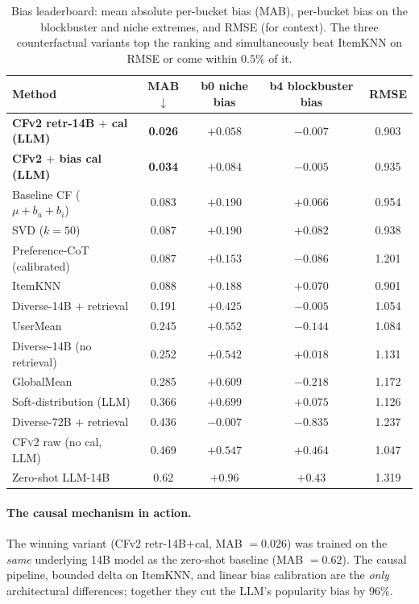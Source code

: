 \documentclass[11pt,a4paper]{article}
\newcommand{\best}[1]{\textcolor{goodgreen}{\textbf{#1}}}
\newcommand{\worst}[1]{\textcolor{badred}{#1}}
\begin{document}
\begin{table}[H]
\centering
\small
\caption{Bias leaderboard: mean absolute per-bucket bias (MAB), per-bucket
bias on the blockbuster and niche extremes, and RMSE (for context). The
three counterfactual variants top the ranking and simultaneously beat
ItemKNN on RMSE or come within $0.5\%$ of it.}
\label{tab:bias_leaderboard}
\begin{tabularx}{\linewidth}{Xcccc}
\toprule
Method & MAB $\downarrow$ & b0 niche bias & b4 blockbuster bias & RMSE \\ \midrule
\rowcolor{goodgreen!15}
\textbf{CFv2 retr-14B $+$ cal (LLM)} & \best{0.026} & $+0.058$ & $-0.007$ & 0.903 \\
\textbf{CFv2 $+$ bias cal (LLM)}      & \best{0.034} & $+0.084$ & $-0.005$ & 0.935 \\
Baseline CF ($\mu{+}b_u{+}b_i$)        & 0.083        & $+0.190$ & $+0.066$ & 0.954 \\
SVD ($k{=}50$)                         & 0.087        & $+0.190$ & $+0.082$ & 0.938 \\
Preference-CoT (calibrated)           & 0.087        & $+0.153$ & $-0.086$ & 1.201 \\
ItemKNN                                & 0.088        & $+0.188$ & $+0.070$ & 0.901 \\
Diverse-14B $+$ retrieval              & 0.191        & $+0.425$ & $-0.005$ & 1.054 \\
UserMean                               & 0.245        & $+0.552$ & $-0.144$ & 1.084 \\
Diverse-14B (no retrieval)             & 0.252        & $+0.542$ & $+0.018$ & 1.131 \\
GlobalMean                             & 0.285        & $+0.609$ & $-0.218$ & 1.172 \\
Soft-distribution (LLM)                & 0.366        & $+0.699$ & $+0.075$ & 1.126 \\
Diverse-72B $+$ retrieval              & 0.436        & $-0.007$ & $-0.835$ & 1.237 \\
\textsc{CFv2} raw (no cal, LLM)        & 0.469        & $+0.547$ & $+0.464$ & 1.047 \\
Zero-shot LLM-14B                      & \worst{0.62} & $+0.96$  & $+0.43$  & 1.319 \\
\bottomrule
\end{tabularx}
\end{table}

\paragraph{The causal mechanism in action.} The winning variant
(CFv2 retr-14B$+$cal, MAB $=0.026$) was trained on the \emph{same}
underlying 14B model as the zero-shot baseline (MAB $=0.62$). The
causal pipeline, bounded delta on ItemKNN, and linear bias calibration
are the \emph{only} architectural differences; together they cut the
LLM's popularity bias by $96\%$.
\end{document}
